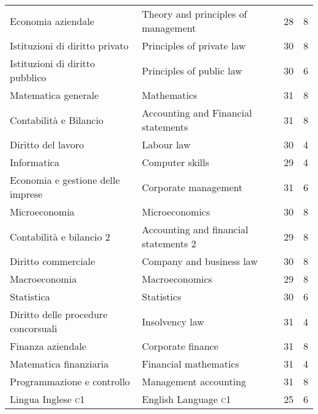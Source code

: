 \documentclass[a4paper,10pt]{article}
\begin{document}
\begin{center}

    \tabletail{%
    }
    \tablelasttail{}

    \begin{supertabular}{p{4.9cm} p{4.9cm} c c}
      Economia aziendale&Theory and principles of management& 28 & 8\\
      Istituzioni di diritto privato&Principles of private law&30&8\\
      Istituzioni di diritto pubblico
      &
      Principles of public law
      & 30&
      6
      \\
      Matematica generale
      & Mathematics
      &31&8\\
      Contabilit\`a e Bilancio
      & Accounting and Financial statements
      & 31 & 8\\
      Diritto del lavoro
      &
      Labour law
      & 30&
      4
      \\
      Informatica & Computer skills &29& 4
      \\
      Economia e gestione delle imprese & Corporate management &31&6
      \\
      Microeconomia & Microeconomics &30&8
      \\
      Contabilit\`a e bilancio 2 & Accounting and financial statements 2
      &29&8 \\
      Diritto commerciale & Company and business law &30&8
      \\
      Macroeconomia & Macroeconomics &29&8
      \\
      Statistica & Statistics &30&6\\
      Diritto delle procedure concorsuali & Insolvency law &31&4
      \\
      Finanza aziendale
      & Corporate finance
      &31 &8 \\
      Matematica finanziaria & Financial mathematics &31&4
      \\
      Programmazione e controllo
      & Management accounting &31&8
      \\
      Lingua Inglese \textsc{c1}& English Language \textsc{c1}& 25&6\\

\end{supertabular}
\end{center}
\end{document}
